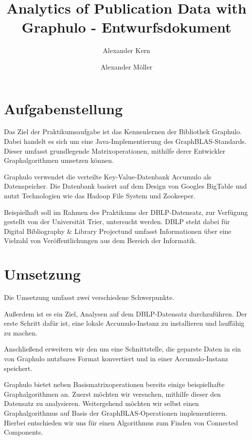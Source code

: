 \documentclass{article}
\title{Analytics of Publication Data with Graphulo - Entwurfsdokument}
\author{Alexander Kern \and Alexander Möller}
\begin{document}
\maketitle
	
\section{Aufgabenstellung}

Das Ziel der Praktikumsaufgabe ist das Kennenlernen der Bibliothek Graphulo. Dabei handelt es sich um eine Java-Implementierung des GraphBLAS-Standards. Dieser umfasst grundlegende Matrixoperationen, mithilfe derer Entwickler Graphalgorithmen umsetzen können. \cite{graph}

Graphulo verwendet die verteilte Key-Value-Datenbank Accumulo als Datenspeicher. Die Datenbank basiert auf dem Design von Googles BigTable und nutzt Technologien wie das Hadoop File System und Zookeeper. \cite{acc} 

Beispielhaft soll im Rahmen des Praktikums der DBLP-Datensatz, zur Verfügung gestellt von der Universität Trier, untersucht werden. DBLP steht dabei für \glqq Digital Bibliography \& Library Project\grqq und umfasst Informationen über eine Vielzahl von Veröffentlichungen aus dem Bereich der Informatik. \cite{dblp}


\section{Umsetzung}

Die Umsetzung umfasst zwei verschiedene Schwerpunkte. 

Außerdem ist es ein Ziel, Analysen auf dem DBLP-Datensatz durchzuführen. Der erste Schritt dafür ist, eine lokale Accumulo-Instanz zu installieren und lauffähig zu machen.

Anschließend erweitern wir den \cite{pars} um eine Schnittstelle, die geparste Daten in ein von Graphulo nutzbares Format konvertiert und in einer Accumulo-Instanz speichert.

Graphulo bietet neben Basismatrixoperationen bereits einige beispielhafte Graphalgorithmen an. Zuerst möchten wir versuchen, mithilfe dieser den Datensatz zu analysieren. Weitergehend möchten wir selbst einen Graphalgorithmus auf Basis der GraphBLAS-Operationen implementieren. Hierbei entschieden wir uns für einen Algorithmus zum Finden von Connected Components. 
\end{document}
